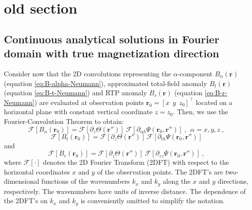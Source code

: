 \section{old section}

\subsection{Continuous analytical solutions in Fourier domain with true magnetization direction}
\label{subsec:Fourier_domain_true_mag}

Consider now that the 2D convolutions representing the 
$\alpha$-component $B_{\alpha}(\mathbf{r})$ (equation \ref{eq:B-alpha-Neumann}),
approximated total-field anomaly $B_{t}(\mathbf{r})$ (equation \ref{eq:B-t-Neumann}) 
and RTP anomaly $B_{r}(\mathbf{r})$ (equation \ref{eq:B-r-Neumann}) are 
evaluated at observation points $\mathbf{r}_{0} = \left[x \:\: y \:\: z_{0} \right]^{\top}$ 
located on a horizontal plane with constant vertical coordinate $z = z_{0}$. 
Then, we use the Fourier-Convolution Theorem \cite[][ p. 268]{blakely1996} to obtain:
\begin{equation}
\mathcal{F}\left[ B_{\alpha}(\mathbf{r}_{0}) \right] = 
\mathcal{F}\left[ \partial_{z} \Theta(\mathbf{r}'') \right] \: 
\mathcal{F}\left[ \partial_{\alpha h} \Psi(\mathbf{r}_{0}, \mathbf{r}'') \right] \: ,
\:\: \alpha = x, y, z \: ,
\label{eq:Fourier-B-alpha}
\end{equation}
\begin{equation}
\mathcal{F}\left[ B_{t}(\mathbf{r}_{0}) \right] = 
\mathcal{F}\left[ \partial_{z} \Theta(\mathbf{r}'') \right] \: 
\mathcal{F}\left[ \partial_{th} \Psi(\mathbf{r}_{0}, \mathbf{r}'') \right]
\label{eq:Fourier-B-t}
\end{equation}
and
\begin{equation}
\mathcal{F}\left[ B_{r}(\mathbf{r}_{0}) \right] = 
\mathcal{F}\left[ \partial_{z} \Theta(\mathbf{r}'') \right] \: 
\mathcal{F}\left[ \partial_{zz} \Psi(\mathbf{r}_{0}, \mathbf{r}'') \right] \: ,
\label{eq:Fourier-B-r}
\end{equation}
where $\mathcal{F}\left[ \cdot \right]$ denotes the 2D Fourier Transform (2DFT)
with respect to the horizontal coordinates $x$ and $y$ of the observation points.
The 2DFT's are two-dimensional functions of the wavenumbers $k_{x}$ and $k_{y}$ 
along the $x$ and $y$ directions, respectively. The wavenumbers have units of 
inverse distance. The dependence of the 2DFT's on $k_{x}$ and $k_{y}$ is conveniently
omitted to simplify the notation.

